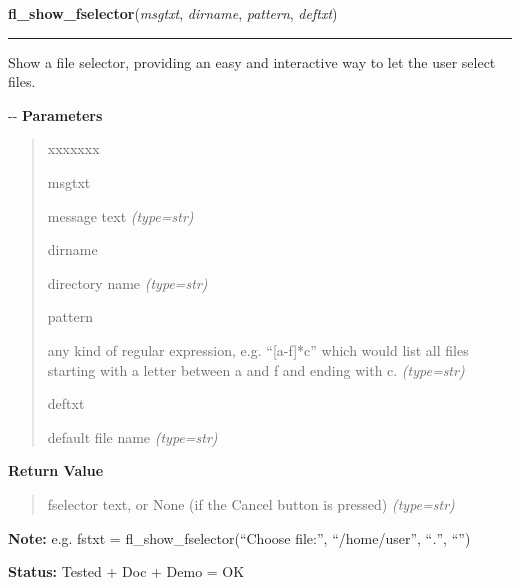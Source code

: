 \hspace{.8\funcindent}\begin{boxedminipage}{\funcwidth}

    \raggedright \textbf{fl\_show\_fselector}(\textit{msgtxt}, \textit{dirname}, \textit{pattern}, \textit{deftxt})

    \vspace{-1.5ex}

    \rule{\textwidth}{0.5\fboxrule}
\setlength{\parskip}{2ex}

Show a file selector, providing an easy and interactive way to let
the user select files.

-{}-
\setlength{\parskip}{1ex}
      \textbf{Parameters}
      \vspace{-1ex}

      \begin{quote}
        \begin{Ventry}{xxxxxxx}

          \item[msgtxt]


message text
            {\it (type=str)}

          \item[dirname]


directory name
            {\it (type=str)}

          \item[pattern]


any kind of regular expression, e.g. ``{[}a-f{]}*c'' which would list all
files starting with a letter between a and f and ending with c.
            {\it (type=str)}

          \item[deftxt]


default file name
            {\it (type=str)}

        \end{Ventry}

      \end{quote}

      \textbf{Return Value}
    \vspace{-1ex}

      \begin{quote}

fselector text, or None (if the Cancel button is pressed)
      {\it (type=str)}

      \end{quote}

\textbf{Note:} 
e.g. fstxt = fl\_show\_fselector(``Choose file:'', ``/home/user'',
``\emph{.}'', ``'')


\textbf{Status:} 
Tested + Doc + Demo = OK


    \end{boxedminipage}

